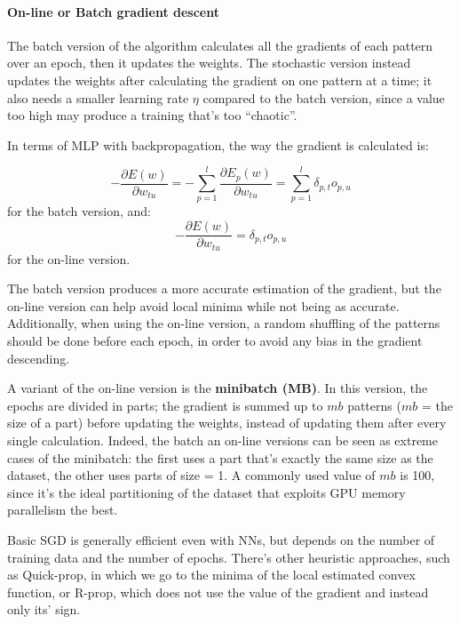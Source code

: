 \paragraph{On-line or Batch gradient descent}

The batch version of the algorithm calculates all the gradients of each pattern over an epoch, then it updates the weights. The stochastic version instead updates the weights after calculating the gradient on one pattern at a time; it also needs a smaller learning rate $\eta$ compared to the batch version, since a value too high may produce a training that's too ``chaotic''.

In terms of MLP with backpropagation, the way the gradient is calculated is:

\begin{equation*}
    - \dfrac{\partial E(w)}{\partial w_{tu}} = - \sum_{p=1}^l \dfrac{\partial E_p(w)}{\partial w_{tu}} = \sum_{p=1}^l \delta_{p,t} o_{p,u}
\end{equation*}
for the batch version, and:
\begin{equation*}
    - \dfrac{\partial E(w)}{\partial w_{tu}} = \delta_{p,t} o_{p,u}
\end{equation*}
for the on-line version.

The batch version produces a more accurate estimation of the gradient, but the on-line version can help avoid local minima while not being as accurate. Additionally, when using the on-line version, a random shuffling of the patterns should be done before each epoch, in order to avoid any bias in the gradient descending.

A variant of the on-line version is the \textbf{minibatch (MB)}. In this version, the epochs are divided in parts; the gradient is summed up to $mb$ patterns ($mb$ = the size of a part) before updating the weights, instead of updating them after every single calculation. Indeed, the batch an on-line versions can be seen as extreme cases of the minibatch: the first uses a part that's exactly the same size as the dataset, the other uses parts of size = 1. A commonly used value of $mb$ is 100, since it's the ideal partitioning of the dataset that exploits GPU memory parallelism the best.

Basic SGD is generally efficient even with NNs, but depends on the number of training data and the number of epochs. There's other heuristic approaches, such as Quick-prop, in which we go to the minima of the local estimated convex function, or R-prop, which does not use the value of the gradient and instead only its' sign.

